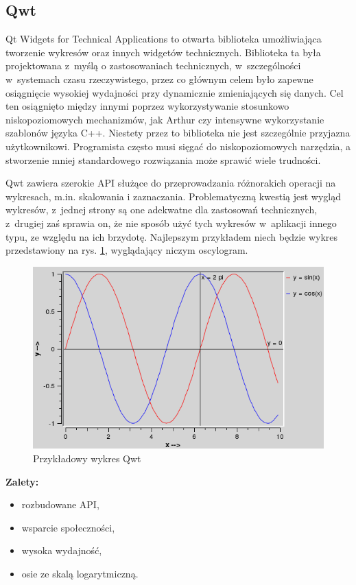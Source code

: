 \subsection{Qwt}
Qt Widgets for Technical Applications to otwarta biblioteka umożliwiająca tworzenie wykresów oraz innych widgetów technicznych. Biblioteka ta była projektowana z~myślą o zastosowaniach technicznych, w~szczególności w~systemach czasu rzeczywistego, przez co głównym celem było zapewne osiągnięcie wysokiej wydajności przy dynamicznie zmieniających się danych. Cel ten osiągnięto między innymi poprzez wykorzystywanie stosunkowo niskopoziomowych mechanizmów, jak Arthur czy intensywne wykorzystanie szablonów języka C++. Niestety przez to biblioteka nie jest szczególnie przyjazna użytkownikowi. Programista często musi sięgać do niskopoziomowych narzędzia, a stworzenie mniej standardowego rozwiązania może sprawić wiele trudności.\newline

Qwt zawiera szerokie API służące do przeprowadzania różnorakich operacji na wykresach, m.in. skalowania i zaznaczania. Problematyczną kwestią jest wygląd wykresów, z~jednej strony są one adekwatne dla zastosowań technicznych, z~drugiej zaś sprawia on, że nie sposób użyć tych wykresów w~aplikacji innego typu, ze względu na ich brzydotę. Najlepszym przykładem niech będzie wykres przedstawiony na rys. \ref{rys:wykres:sinus}, wyglądający niczym oscylogram.
\begin{figure}[H]
\centering
\includegraphics[scale=0.4]{img/sinus.png}
\caption{Przykładowy wykres Qwt}\label{rys:wykres:sinus}
\end{figure}

\textbf{Zalety:}
\begin{itemize}
\item{rozbudowane API,}
\item{wsparcie społeczności,}
\item{wysoka wydajność,}
\item{osie ze skalą logarytmiczną.}\newline
\end{itemize}

